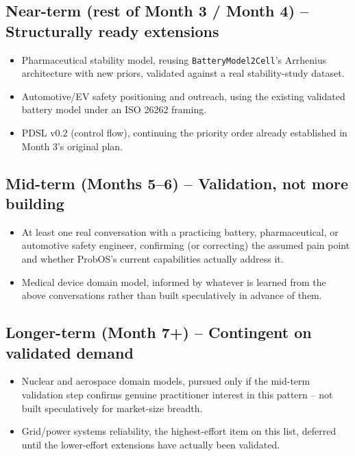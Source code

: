 \documentclass[11pt]{article}
\begin{document}
\subsection*{Near-term (rest of Month 3 / Month 4) -- Structurally ready extensions}
\begin{itemize}[leftmargin=*]
  \item Pharmaceutical stability model, reusing
    \texttt{BatteryModel2Cell}'s Arrhenius architecture with new
    priors, validated against a real stability-study dataset.
  \item Automotive/EV safety positioning and outreach, using the
    existing validated battery model under an ISO 26262 framing.
  \item PDSL v0.2 (control flow), continuing the priority order
    already established in Month 3's original plan.
\end{itemize}

\subsection*{Mid-term (Months 5--6) -- Validation, not more building}
\begin{itemize}[leftmargin=*]
  \item At least one real conversation with a practicing battery,
    pharmaceutical, or automotive safety engineer, confirming
    (or correcting) the assumed pain point and whether ProbOS's
    current capabilities actually address it.
  \item Medical device domain model, informed by whatever is learned
    from the above conversations rather than built speculatively in
    advance of them.
\end{itemize}

\subsection*{Longer-term (Month 7+) -- Contingent on validated demand}
\begin{itemize}[leftmargin=*]
  \item Nuclear and aerospace domain models, pursued only if the
    mid-term validation step confirms genuine practitioner interest
    in this pattern -- not built speculatively for market-size
    breadth.
  \item Grid/power systems reliability, the highest-effort item on
    this list, deferred until the lower-effort extensions have
    actually been validated.
\end{itemize}
\end{document}
